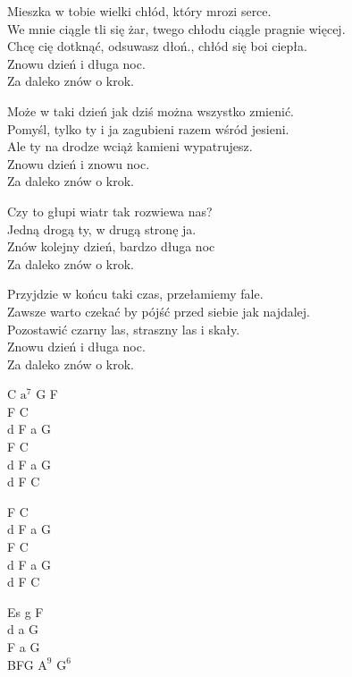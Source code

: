 \begin{text}
    \footnotesize{
    \hfill\break
    Mieszka w tobie wielki chłód, który mrozi serce.\\
    We mnie ciągle tli się żar, twego chłodu ciągle pragnie więcej.\\
    Chcę cię dotknąć, odsuwasz dłoń., chłód się boi ciepła.\\
    Znowu dzień i długa noc.\\
    Za daleko znów o krok.

    Może w taki dzień jak dziś można wszystko zmienić.\\
    Pomyśl, tylko ty i ja zagubieni razem wśród jesieni.\\
    Ale ty na drodze wciąż kamieni wypatrujesz.\\
    Znowu dzień i znowu noc.\\
    Za daleko znów o krok.

    Czy to głupi wiatr tak rozwiewa nas?\\
    Jedną drogą ty, w drugą stronę ja.\\
    Znów kolejny dzień, bardzo długa noc\\
    Za daleko znów o krok.

    Przyjdzie w końcu taki czas, przełamiemy fale.\\
    Zawsze warto czekać by pójść przed siebie jak najdalej.\\
    Pozostawić czarny las, straszny las i skały.\\
    Znowu dzień i długa noc.\\
    Za daleko znów o krok.
    }
\end{text}
\begin{chord}
    \footnotesize{
    C $\mathrm{a^7}$ G F\\
    F C\\
    d F a G\\
    F C\\
    d F a G\\
    d F C

    F C\\
    d F a G\\
    F C\\
    d F a G\\
    d F C

    Es g F\\
    d a G\\
    F a G\\
    BFG $\mathrm{A^{9}}$ $\mathrm{G^6}$
    }
\end{chord}
